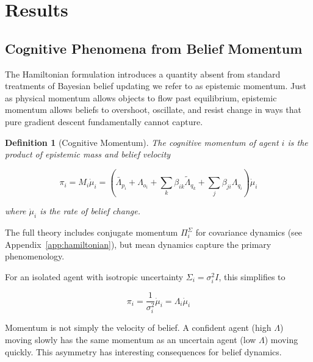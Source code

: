 \documentclass[12pt]{article}
\newtheorem{definition}[theorem]{Definition}
\begin{document}
\section{Results}

\subsection{Cognitive Phenomena from Belief Momentum}
\label{sec:cognitive-momentum}

The Hamiltonian formulation introduces a quantity absent from standard treatments of Bayesian belief updating we refer to as epistemic momentum. Just as physical momentum allows objects to flow past equilibrium, epistemic momentum allows beliefs to overshoot, oscillate, and resist change in ways that pure gradient descent fundamentally cannot capture. 


\begin{definition}[Cognitive Momentum]

The cognitive momentum of agent $i$ is the product of epistemic mass and belief velocity

\begin{equation}
\boxed{\pi_i = M_i \dot{\mu}_i = \left(\bar{\Lambda}_{p_i} + \Lambda_{o_i}+ \sum_k \beta_{ik}\tilde{\Lambda}_{q_k} + \sum_j \beta_{ji}\Lambda_{q_i}\right) \dot{\mu}_i}
\end{equation}

where $\dot{\mu}_i$ is the rate of belief change.

\end{definition}

The full theory includes conjugate momentum $\Pi_i^\Sigma$ for covariance dynamics 
(see Appendix~\ref{app:hamiltonian}), but mean dynamics capture the primary phenomenology.

For an isolated agent with isotropic uncertainty $\Sigma_i = \sigma_i^2 I$, this simplifies to

\begin{equation}
\pi_i = \frac{1}{\sigma_i^2}\dot{\mu}_i = \Lambda_i \dot{\mu}_i
\end{equation}

 Momentum is not simply the velocity of belief. A confident agent (high $\Lambda$) moving slowly has the same momentum as an uncertain agent (low $\Lambda$) moving quickly. This asymmetry has interesting consequences for belief dynamics.
\end{document}

